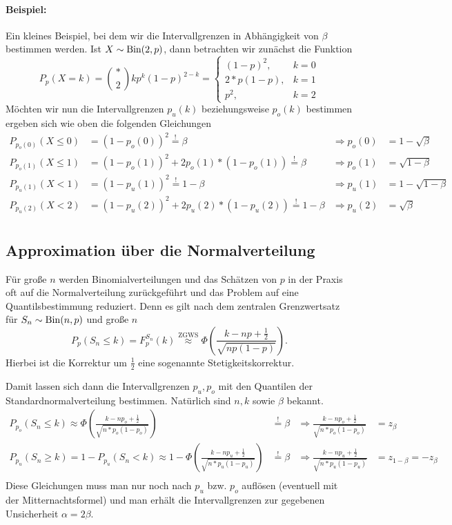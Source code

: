 \paragraph{Beispiel:}
Ein kleines Beispiel, bei dem wir die Intervallgrenzen in Abhängigkeit von $\beta$ bestimmen werden.
Ist $X\sim\operatorname{Bin}(2,p)$, dann betrachten wir zunächst die Funktion
\begin{equation*}
	P_p(X=k)=\binom *2k p^k(1-p)^{2-k}=\begin{cases}
		(1-p)^2,&k=0\\
		2*p(1-p),&k=1\\
		p^2,&k=2
	\end{cases}
\end{equation*}
Möchten wir nun die Intervallgrenzen $p_u(k)$ beziehungsweise $p_o(k)$ bestimmen ergeben sich wie oben die folgenden Gleichungen
\begin{align*}
	P_{p_o(0)}(X\leq 0)&=(1-p_o(0))^2\overset!=\beta&\Rightarrow p_o(0)&=1-\sqrt\beta\\
	P_{p_o(1)}(X\leq 1)&=(1-p_o(1))^2+2p_o(1)*(1-p_o(1))\overset!= \beta &\Rightarrow p_o(1)&=\sqrt{1-\beta}\\
	P_{p_u(1)}(X<1)&=(1-p_u(1))^2\overset!=1-\beta&\Rightarrow p_u(1)&=1-\sqrt{1-\beta}\\
	P_{p_u(2)}(X<2)&=(1-p_u(2))^2+2p_u(2)*(1-p_u(2))\overset!=1-\beta &\Rightarrow p_u(2)&=\sqrt{\beta}\\
\end{align*}

\subsection{Approximation über die Normalverteilung}
Für große $n$ werden Binomialverteilungen und das Schätzen von $p$ in der Praxis oft auf die Normalverteilung zurückgeführt und das Problem auf eine Quantilsbestimmung reduziert.
Denn es gilt nach dem zentralen Grenzwertsatz für $S_n\sim\operatorname{Bin}(n,p)$ und große $n$
\begin{equation*}
	P_p(S_n\leq k) = F^{S_n}_p(k)\overset{\text{ZGWS}}\approx \Phi\left(\frac{k-np+\frac12}{\sqrt{np(1-p)}}\right).
\end{equation*}
Hierbei ist die Korrektur um $\frac12$ eine sogenannte Stetigkeitskorrektur.

Damit lassen sich dann die Intervallgrenzen $p_u,p_o$ mit den Quantilen der Standardnormalverteilung bestimmen. Natürlich sind $n,k$ sowie $\beta$ bekannt.
\begin{align*}
	P_{p_o}(S_n\leq k)\approx \Phi\left(\frac{k-np_o+\frac12}{\sqrt{n*p_o(1-p_o)}}\right)&\overset!=\beta
	&\Rightarrow \frac{k-np_o+\frac12}{\sqrt{n*p_o(1-p_o)}}&=z_\beta\\
	P_{p_u}(S_n\geq k)=1-P_{p_u}(S_n<k)\approx 1-\Phi\left(\frac{k-np_u+\frac12}{\sqrt{n*p_u(1-p_u)}}\right)&\overset!=\beta
	&\Rightarrow \frac{k-np_u+\frac12}{\sqrt{n*p_u(1-p_u)}}&=z_{1-\beta}=-z_\beta\\
\end{align*}
Diese Gleichungen muss man nur noch nach $p_u$ bzw. $p_o$ auflösen (eventuell mit der Mitternachtsformel) und man erhält die Intervallgrenzen zur gegebenen Unsicherheit $\alpha=2\beta$.

